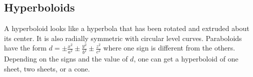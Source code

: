 \subsection{Hyperboloids}
\noindent
A hyperboloid looks like a hyperbola that has been rotated and extruded about its center. It is also radially symmetric with circular level curves. Paraboloids have the form $d = \pm \frac{x^2}{a^2} \pm \frac{y^2}{b^2} \pm \frac{z^2}{c^2}$ where one sign is different from the others. Depending on the signs and the value of $d$, one can get a hyperboloid of one sheet, two sheets, or a cone.



